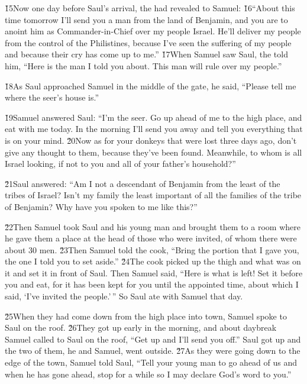 \v{15}Now one day before Saul's arrival, the  had revealed to Samuel: \v{16}``About this time tomorrow I'll send you a man from the land of Benjamin, and you are to anoint him as Commander-in-Chief over my people Israel. He'll deliver my people from the control of the Philistines, because I've seen the suffering of my people and because their cry has come up to me.'' \v{17}When Samuel saw Saul, the  told him, ``Here is the man I told you about. This man will rule over my people.''

\v{18}As Saul approached Samuel in the middle of the gate, he said, ``Please tell me where the seer's house is.''

\v{19}Samuel answered Saul: ``I'm the seer. Go up ahead of me to the high place, and eat with me today. In the morning I'll send you away and tell you everything that is on your mind. \v{20}Now as for your donkeys that were lost three days ago, don't give any thought to them, because they've been found. Meanwhile, to whom is all Israel looking, if not to you and all of your father's household?''

\v{21}Saul answered: ``Am I not a descendant of Benjamin from the least of the tribes of Israel? Isn't my family the least important of all the families of the tribe of Benjamin? Why have you spoken to me like this?''

\v{22}Then Samuel took Saul and his young man and brought them to a room where he gave them a place at the head of those who were invited, of whom there were about 30 men. \v{23}Then Samuel told the cook, ``Bring the portion that I gave you, the one I told you to set aside.'' \v{24}The cook picked up the thigh and what was on it and set it in front of Saul. Then Samuel said, ``Here is what is left! Set it before you and eat, for it has been kept for you until the appointed time, about which I said, `I've invited the people.'\,'' So Saul ate with Samuel that day.

\v{25}When they had come down from the high place into town, Samuel spoke to Saul on the roof. \v{26}They got up early in the morning, and about daybreak Samuel called to Saul on the roof, ``Get up and I'll send you off.'' Saul got up and the two of them, he and Samuel, went outside. \v{27}As they were going down to the edge of the town, Samuel told Saul, ``Tell your young man to go ahead of us and when he has gone ahead, stop for a while so I may declare God's word to you.''

